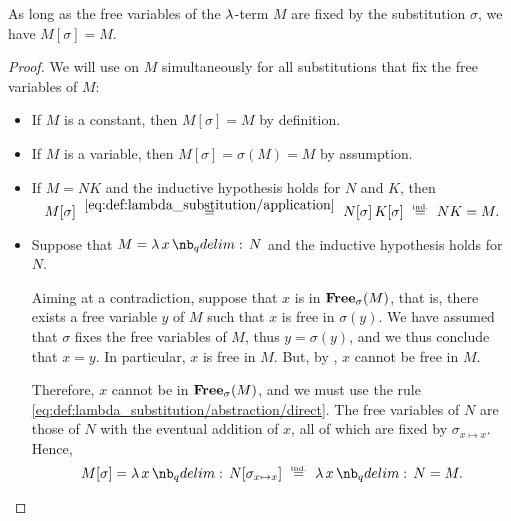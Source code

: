 \begin{proposition}\label{thm:lambda_substitution_noop}
  As long as the free variables of the \( \mathrm{\lambda} \)-term \( M \) are fixed by the substitution \( \sigma \), we have \( M[\sigma] = M \).
\end{proposition}
\begin{proof}
  We will use  on \( M \) simultaneously for all substitutions that fix the free variables of \( M \):
  \begin{itemize}
    \item If \( M \) is a constant, then \( M[\sigma] = M \) by definition.
    \item If \( M \) is a variable, then \( M[\sigma] = \sigma(M) = M \) by assumption.
    \item If \( M = NK \) and the inductive hypothesis holds for \( N \) and \( K \), then
    \begin{equation*}
      M[\sigma]
      \reloset {\eqref{eq:def:lambda_substitution/application}} =
      N[\sigma] \thinspace K[\sigma]
      \reloset {\T{ind.}} =
      N K
      =
      M.
    \end{equation*}

    \item Suppose that \( M = \qabs x N \) and the inductive hypothesis holds for \( N \).

    Aiming at a contradiction, suppose that \( x \) is in \( \op*{Free}_\sigma(M) \), that is, there exists a free variable \( y \) of \( M \) such that \( x \) is free in \( \sigma(y) \). We have assumed that \( \sigma \) fixes the free variables of \( M \), thus \( y = \sigma(y) \), and we thus conclude that \( x = y \). In particular, \( x \) is free in \( M \). But, by , \( x \) cannot be free in \( M \).

    Therefore, \( x \) cannot be in \( \op*{Free}_\sigma(M) \), and we must use the rule \eqref{eq:def:lambda_substitution/abstraction/direct}. The free variables of \( N \) are those of \( N \) with the eventual addition of \( x \), all of which are fixed by \( \sigma_{x \mapsto x} \). Hence,
    \begin{equation*}
      M[\sigma]
      =
      \qabs x N[\sigma_{x \mapsto x}]
      \reloset {\T{ind.}} =
      \qabs x N
      =
      M.
    \end{equation*}
  \end{itemize}
\end{proof}

